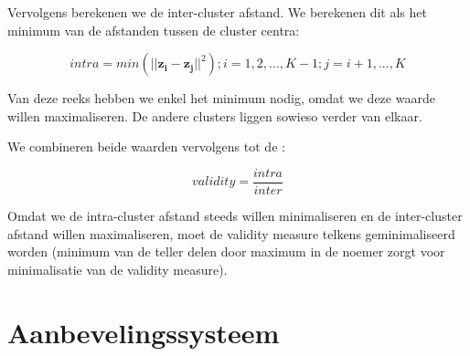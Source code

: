 Vervolgens berekenen we de inter-cluster afstand. We berekenen dit als het minimum van de afstanden tussen de cluster centra:

\begin{equation}
intra = min(\vert\vert \mathbf{z_i-z_j}\vert\vert^2) ; i = 1,2,...,K-1 ; j = i+1, ..., K
\end{equation}

Van deze reeks hebben we enkel het minimum nodig, omdat we deze waarde willen maximaliseren. De andere clusters liggen sowieso verder van elkaar.

We combineren beide waarden vervolgens tot de :

\begin{equation}
validity = \frac{intra}{inter}
\end{equation}

Omdat we de intra-cluster afstand steeds willen minimaliseren en de inter-cluster afstand willen maximaliseren, moet de validity measure telkens geminimaliseerd worden (minimum van de teller delen door maximum in de noemer zorgt voor minimalisatie van de validity measure). 

\section{Aanbevelingssysteem}